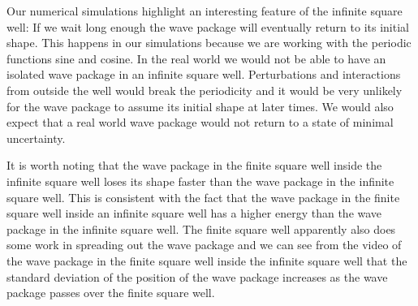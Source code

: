 \documentclass[12pt,a4paper]{article}
\begin{document}
Our numerical simulations highlight an interesting feature of the infinite square well: If we wait long enough the wave package will eventually return to its initial shape. This happens in our simulations because we are working with the periodic functions sine and cosine. In the real world we would not be able to have an isolated wave package in an infinite square well. Perturbations and interactions from outside the well would break the periodicity and it would be very unlikely for the wave package to assume its initial shape at later times. We would also expect that a real world wave package would not return to a state of minimal uncertainty.

It is worth noting that the wave package in the finite square well inside the infinite square well loses its shape faster than the wave package in the infinite square well. This is consistent with the fact that the wave package in the finite square well inside an infinite square well has a higher energy than the wave package in the infinite square well. The finite square well apparently also does some work in spreading out the wave package and we can see from the video of the wave package in the finite square well inside the infinite square well that the standard deviation of the position of the wave package increases as the wave package passes over the finite square well.
\end{document}
